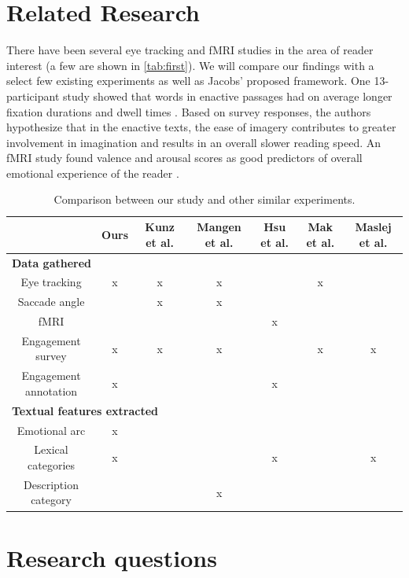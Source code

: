 \documentclass[11pt]{article}
\begin{document}
\section{Related Research}
There have been several eye tracking and fMRI studies in the area of reader interest (a few are shown in \autoref{tab:first}). We will compare our findings with a select few existing experiments as well as Jacobs' proposed framework. One 13-participant study showed that words in enactive passages had on average longer fixation durations and dwell times \citep{Magyari2020}. Based on survey responses, the authors hypothesize that in the enactive texts, the ease of imagery contributes to greater involvement in imagination and results in an overall slower reading speed. An fMRI study found valence and arousal scores as good predictors of overall emotional experience of the reader \citep{HSU201596}. 


\begin{table}[h]
\centering
\begin{tabular}{|c|c|c|c|c|c|c|}
\hline
& \textbf{Ours} & \textbf{Kunz et al.} & \textbf{Mangen et al.} & \textbf{Hsu et al.} & \textbf{Mak et al.} & \textbf{Maslej et al.} \\
\hline
\multicolumn{7}{|l|}{\textbf{Data gathered}}\\\hline
Eye tracking & x & x & x &  & x &  \\\hline
Saccade angle &  & x & x &  &  & \\\hline
fMRI &  &  &  & x &  & \\\hline
Engagement survey & x & x & x &  & x & x\\\hline
Engagement annotation & x &  &  & x &  & \\\hline
\multicolumn{7}{|l|}{\textbf{Textual features extracted}}\\\hline
Emotional arc & x &  &  &  &  & \\\hline
Lexical categories & x &  &  & x &  & x\\\hline
Description category &  &  & x &  &  & \\\hline

\end{tabular}
\caption{Comparison between our study and other similar experiments.}
\label{tab:first}
\end{table}

\section{Research questions}
\end{document}

